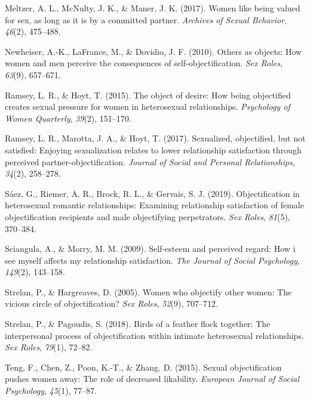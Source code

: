 \documentclass[
  man]{apa6}
\newlength{\cslhangindent}
\newlength{\cslentryspacingunit} %
\newenvironment{CSLReferences}[2] %
 {%
  \setlength{\parindent}{0pt}
  \ifodd #1
  \let\oldpar\par
  \def\par{\hangindent=\cslhangindent\oldpar}
  \fi
  \setlength{\parskip}{#2\cslentryspacingunit}
 }%
 {}
\begin{document}
\begin{CSLReferences}{1}{0}
\leavevmode{}%
Meltzer, A. L., McNulty, J. K., \& Maner, J. K. (2017). Women like being valued for sex, as long as it is by a committed partner. \emph{Archives of Sexual Behavior}, \emph{46}(2), 475--488.

\leavevmode{}%
Newheiser, A.-K., LaFrance, M., \& Dovidio, J. F. (2010). Others as objects: How women and men perceive the consequences of self-objectification. \emph{Sex Roles}, \emph{63}(9), 657--671.

\leavevmode{}%
Ramsey, L. R., \& Hoyt, T. (2015). The object of desire: How being objectified creates sexual pressure for women in heterosexual relationships. \emph{Psychology of Women Quarterly}, \emph{39}(2), 151--170.

\leavevmode{}%
Ramsey, L. R., Marotta, J. A., \& Hoyt, T. (2017). Sexualized, objectified, but not satisfied: Enjoying sexualization relates to lower relationship satisfaction through perceived partner-objectification. \emph{Journal of Social and Personal Relationships}, \emph{34}(2), 258--278.

\leavevmode{}%
Sáez, G., Riemer, A. R., Brock, R. L., \& Gervais, S. J. (2019). Objectification in heterosexual romantic relationships: Examining relationship satisfaction of female objectification recipients and male objectifying perpetrators. \emph{Sex Roles}, \emph{81}(5), 370--384.

\leavevmode{}%
Sciangula, A., \& Morry, M. M. (2009). Self-esteem and perceived regard: How i see myself affects my relationship satisfaction. \emph{The Journal of Social Psychology}, \emph{149}(2), 143--158.

\leavevmode{}%
Strelan, P., \& Hargreaves, D. (2005). Women who objectify other women: The vicious circle of objectification? \emph{Sex Roles}, \emph{52}(9), 707--712.

\leavevmode{}%
Strelan, P., \& Pagoudis, S. (2018). Birds of a feather flock together: The interpersonal process of objectification within intimate heterosexual relationships. \emph{Sex Roles}, \emph{79}(1), 72--82.

\leavevmode{}%
Teng, F., Chen, Z., Poon, K.-T., \& Zhang, D. (2015). Sexual objectification pushes women away: The role of decreased likability. \emph{European Journal of Social Psychology}, \emph{45}(1), 77--87.


\end{CSLReferences}
\end{document}

